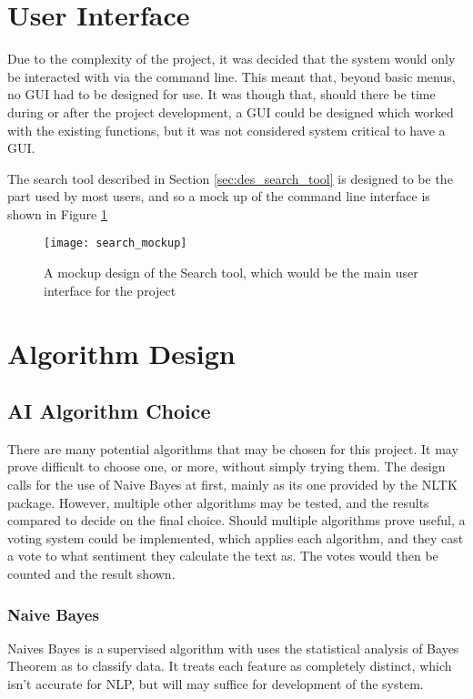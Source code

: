 \section{User Interface}
\label{sec:des_user_interface}
Due to the complexity of the project, it was decided that the system would only be interacted with via the command line. This meant that, beyond basic menus, no GUI had to be designed for use. It was though that, should there be time during or after the project development, a GUI could be designed which worked with the existing functions, but it was not considered system critical to have a GUI.

The search tool described in Section \ref{sec:des_search_tool} is designed to be the part used by most users, and so a mock up of the command line interface is shown in Figure \ref{fig:search_mockup}

\begin{figure}[ht]
\texttt{[image: search\_mockup]}
\caption{A mockup design of the Search tool, which would be the main user interface for the project}
\label{fig:search_mockup}
\end{figure}

\section{Algorithm Design}
\label{sec:des_algorithm}

\subsection{AI Algorithm Choice}
\label{sec:des_AI_algorithm}
There are many potential algorithms that may be chosen for this project. It may prove difficult to choose one, or more, without simply trying them. The design calls for the use of Naive Bayes at first, mainly as its one provided by the NLTK package. However, multiple other algorithms may be tested, and the results compared to decide on the final choice. Should multiple algorithms prove useful, a voting system could be implemented, which applies each algorithm, and they cast a vote to what sentiment they calculate the text as. The votes would then be counted and the result shown.

\subsubsection{Naive Bayes}
Naives Bayes is a supervised algorithm with uses the statistical analysis of Bayes Theorem as to classify data. It treats each feature as completely distinct, which isn't accurate for NLP, but will may suffice for development of the system.


